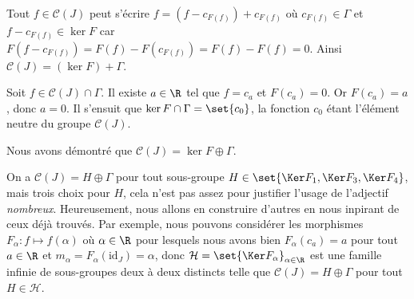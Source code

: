 \begin{enumerate}
    Tout $f\in\mathcal{C}(J)$ peut s'écrire $f = (f - c_{F(f)}) + c_{F(f)}$ où $c_{F(f)}\in\Gamma$ et $f - c_{F(f)}\in\ker F$ car $F(f - c_{F(f)}) = F(f) - F(c_{F(f)}) = F(f) - F(f) = 0$.
    Ainsi $\mathcal{C}(J) = (\ker F) + \Gamma$.

    Soit $f\in\mathcal{C}(J)\cap\Gamma$.
    Il existe $a\in\R$ tel que $f = c_a$ et $F(c_a) = 0$.
    Or $F(c_a) = a$, donc $a = 0$.
    Il s'ensuit que $\ker F\cap\Gamma = \set{c_0}$, la fonction $c_0$ étant l'élément neutre du groupe $\mathcal{C}(J)$.

    Nous avons démontré que $\mathcal{C}(J) = \ker F\oplus\Gamma$.

    On a $\mathcal{C}(J) = H\oplus\Gamma$ pour tout sous-groupe $H\in\set{\Ker F_1, \Ker F_3, \Ker F_4}$, mais trois choix pour $H$, cela n'est pas assez pour justifier l'usage de l'adjectif \emph{nombreux}.
    Heureusement, nous allons en construire d'autres en nous inpirant de ceux déjà trouvés.
    Par exemple, nous pouvons considérer les morphismes $F_\alpha\colon f\mapsto f(\alpha)$ où $\alpha\in\R$ pour lesquels nous avons bien $F_\alpha(c_a) = a$ pour tout $a\in\R$ et $m_\alpha = F_\alpha(\mathrm{id}_J) = \alpha$, donc $\mathcal{H} = \set{\Ker F_\alpha}_{\alpha\in\R}$ est une famille infinie de sous-groupes deux à deux distincts telle que $\mathcal{C}(J) = H\oplus\Gamma$ pour tout $H\in\mathcal{H}$.
\end{enumerate}

